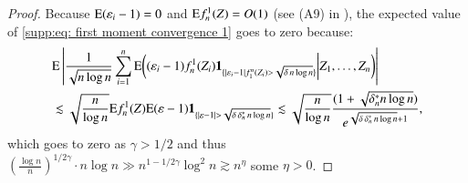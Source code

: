 \begin{proof}
		Because $\mathrm{E}(\varepsilon_i - 1) = 0$ and $\mathrm{E} f_n^1(Z) = O(1)$ (see (A9) in \cite{27}), the expected value of \eqref{supp:eq: first moment convergence 1} goes to zero because:
		\begin{align*}
			&\mathrm{E} \left| \frac{1}{\sqrt{n \log n}} \sum_{i=1}^n \mathrm{E} \bigg( (\varepsilon_i - 1) f_n^1(Z_i) \mathbf{1}_{\{|\varepsilon_i - 1| f^n_1(Z_i) > \sqrt{\delta \, n \log n}\}}  \bigg| Z_1, \ldots, Z_n \bigg) \right| \\
			& \lesssim \sqrt{\frac{n}{\log n}} \mathrm{E} f_n^1(Z) \mathrm{E} ( \varepsilon - 1 ) \mathbf{1}_{\{|\varepsilon - 1| > \sqrt{\delta \, \delta_n^* \, n \log n}\}}  \lesssim \sqrt{\frac{n}{\log n}} \frac{( 1 + \sqrt{\delta_n^* n \log n})}{e^{\sqrt{\delta \, \delta_n^* \, n \log n} + 1}} ,
		\end{align*}
		which goes to zero as $\gamma > 1/2$ and thus $\left( \frac{\log n}{n} \right)^{1/2\gamma} \cdot n \log n \gg n^{1 - 1/2\gamma} \log^2 n \gtrsim n^{\eta}$ some $\eta>0$.


\end{proof}
